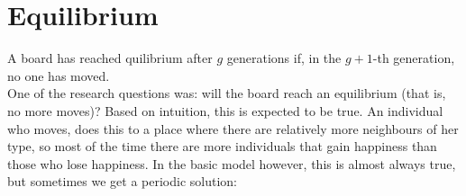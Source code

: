 
\section{Equilibrium}
 A board has reached quilibrium after $g$ generations if, in the $g+1$-th generation, no one has moved.\\
One of the research questions was: will the board reach an equilibrium (that is, no more moves)? Based on intuition, this is expected to be true. An individual who moves, does this to a place where there are relatively more neighbours of her type, so most of the time there are more individuals that gain happiness than those who lose happiness. In the basic model however, this is almost always true, but sometimes we get a periodic solution:\\
\begin{figure}[H]
	

\end{figure}

